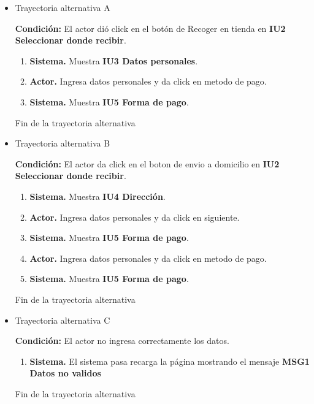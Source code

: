 \begin{itemize}
	
	\item \hypertarget{CU4:TAA}{Trayectoria alternativa A}
	
	\noindent \textbf{Condición:} El actor dió click en el botón de Recoger en tienda en \textbf{IU2 Seleccionar donde recibir}.
	
	\begin{enumerate}
		\item \textbf{Sistema.} Muestra \textbf{IU3 Datos personales}.
		\item \textbf{Actor.} Ingresa datos personales y da click en metodo de pago.
		\item \textbf{Sistema.} Muestra \textbf{IU5 Forma de pago}.
	\end{enumerate}
	
	Fin de la trayectoria alternativa
	
	\item \hypertarget{CU1:TAB}{Trayectoria alternativa B}
	
	\noindent \textbf{Condición:} El actor da click en el boton de envio a domicilio en \textbf{IU2 Seleccionar donde recibir}.

\begin{enumerate}
	\item \textbf{Sistema.} Muestra \textbf{IU4 Dirección}.
	\item \textbf{Actor.} Ingresa datos personales y da click en siguiente.
	\item \textbf{Sistema.} Muestra \textbf{IU5 Forma de pago}.
	\item \textbf{Actor.} Ingresa datos personales y da click en metodo de pago.
	\item \textbf{Sistema.} Muestra \textbf{IU5 Forma de pago}.
\end{enumerate}

	Fin de la trayectoria alternativa
	
	\item \hypertarget{CU1:TAC}{Trayectoria alternativa C}
	
	\noindent \textbf{Condición:} El actor no ingresa correctamente los datos.
	
	\begin{enumerate}
		
		\item \textbf{Sistema.} El sistema pasa recarga la página mostrando el mensaje \textbf{MSG1 Datos no validos}
		
	\end{enumerate}
	
	Fin de la trayectoria alternativa
\end{itemize}	
	

